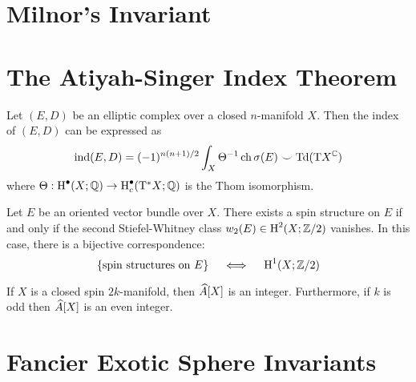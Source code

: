 \section{Milnor's Invariant}\label{sec:milnors-invariant}

\section{The Atiyah-Singer Index Theorem}\label{sec:atiyah-singer-index-theorem}

\begin{theorem}\label{thm:atiyah-singer}
	Let $(E,D)$ be an elliptic complex over a closed $n$-manifold $X$. Then the index of $(E,D)$ can be expressed as
	\[
		\operatorname{\operatorname{ind}}(E,D) = (-1)^{n(n+1)/2}\int_X \Theta^{-1}\operatorname{\operatorname{ch}} \sigma(E)\smile \operatorname{\operatorname{Td}}(\mathrm{T} X^{\mathbb{C}})
	\]
	where $\Theta : \operatorname{H}^\bullet(X;\mathbb{Q}) \to \operatorname{H}_c^\bullet(\mathrm{T}^* X;\mathbb{Q})$ is the Thom isomorphism.
\end{theorem}

\begin{theorem}
	Let $E$ be an oriented vector bundle over $X$. There exists a spin structure on $E$ if and only if the second Stiefel-Whitney class $w_2(E)\in \operatorname{H}^2(X;\mathbb{Z}/2)$ vanishes. In this case, there is a bijective correspondence:
	\[
		\left\{
		\parbox{9em}{
			spin structures on $E$
		}
		\right\}
		\quad\iff\quad
		\H^1(X;\Z/2)
	\]
\end{theorem}

\begin{definition}
\end{definition}

\begin{theorem}\label{thm:Ahat-integrality}
	If $X$ is a closed spin $2k$-manifold, then $\widehat{A}[X]$ is an integer. Furthermore, if $k$ is odd then $\widehat{A}[X]$ is an even integer.
\end{theorem}

\section{Fancier Exotic Sphere Invariants}

\begin{definition}
	
\end{definition}
